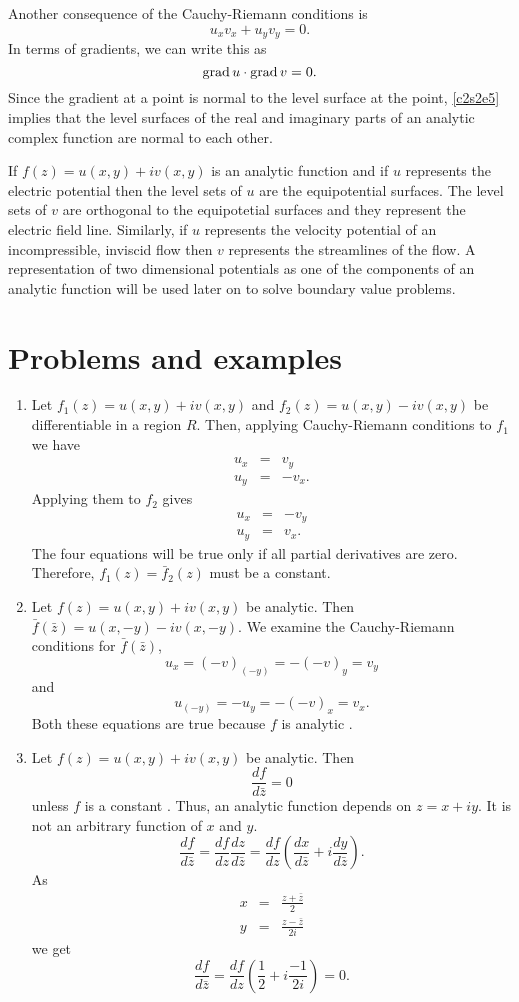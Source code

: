 Another consequence of the Cauchy-Riemann conditions is 
\[
u_xv_x + u_yv_y = 0.
\]
In terms of gradients, we can write this as
\begin{equation}\label{c2s2e5}
\operatorname{grad} u \cdot \operatorname{grad} v = 0.
\end{equation}
Since the gradient at a point is normal to the level surface at the point,
\eqref{c2s2e5} implies that the level surfaces of the real and imaginary parts
of an analytic complex function are normal to each other.

If $f(z) = u(x, y) + iv(x, y)$ is an analytic function and if $u$ represents
the electric potential then the level sets of $u$ are the equipotential
surfaces. The level sets of $v$ are orthogonal to the equipotetial surfaces
and they represent the electric field line. Similarly, if $u$ represents the
velocity potential of an incompressible, inviscid flow then $v$ represents the
streamlines of the flow. A representation of two dimensional potentials as
one of the components of an analytic function will be used later on to solve
boundary value problems.

\section{Problems and examples}\label{c2s3}
\begin{enumerate}
\item Let $f_1(z) = u(x, y) + iv(x, y)$ and $f_2(z) = u(x, y) - iv(x, y)$ be
differentiable in a region $R$. Then, applying Cauchy-Riemann conditions
to $f_1$ we have
\begin{eqnarray*}
u_x &=& v_y \\
u_y &=& -v_x.
\end{eqnarray*}
Applying them to $f_2$ gives
\begin{eqnarray*}
u_x &=& -v_y \\
u_y &=& v_x.
\end{eqnarray*}
The four equations will be true only if all partial derivatives are zero.
Therefore, $f_1(z) = \bar{f}_2(z)$ must be a constant. \cite{aw}

\item Let $f(z) = u(x, y) + iv(x, y)$ be analytic. Then $\bar{f}(\bar{z}) =
u(x, -y) - iv(x, -y)$. We examine the Cauchy-Riemann conditions for $\bar{f}(
\bar{z})$,
\[
u_x = (-v)_{(-y)} = -(-v)_y = v_y
\]
and
\[
u_{(-y)} = -u_y = -(-v)_x = v_x.
\] 
Both these equations are true because $f$ is analytic \cite{aw}.

\item Let $f(z) = u(x, y) + iv(x, y)$ be analytic. Then
\[
\frac{df}{d\bar{z}} = 0
\]
unless $f$ is a constant \cite{aw}. Thus, an analytic function 
depends on $z = x + iy$. It is not an arbitrary function of $x$ and $y$.
\[
\frac{df}{d\bar{z}} = \frac{df}{dz}\frac{dz}{d\bar{z}} = \frac{df}{dz}\left(
\frac{dx}{d\bar{z}} + i\frac{dy}{d\bar{z}}\right).
\]
As
\begin{eqnarray*}
x &=& \frac{z + \bar{z}}{2} \\
y &=& \frac{z - \bar{z}}{2i} 
\end{eqnarray*}
we get
\[
\frac{df}{d\bar{z}} = \frac{df}{dz}\left(\frac{1}{2} + i\frac{-1}{2i}\right)
= 0.
\]
\end{enumerate}
